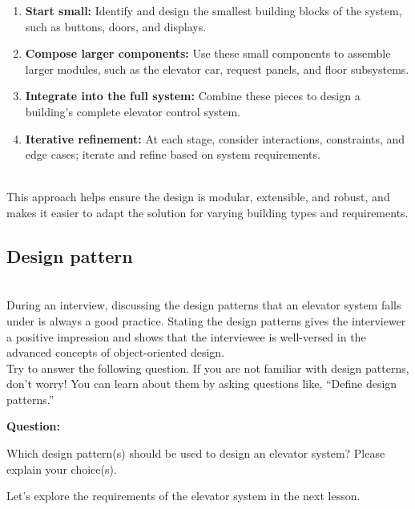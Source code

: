 \begin{enumerate}
\item
\protect{}\label{P9l4Z-e65pwr1nrJHE1EK}
\textbf{Start small:} Identify and design the smallest building blocks of the system, such as buttons, doors, and displays.
\item
\protect{}\label{N8NXqdnxE8TB77BgUiLqc}
\textbf{Compose larger components:} Use these small components to assemble larger modules, such as the elevator car, request panels, and floor subsystems.
\item
\protect{}\label{kTUqqHi9y5usyEqw_kOSg}
\textbf{Integrate into the full system:} Combine these pieces to design a building's complete elevator control system.
\item
\protect{}\label{CuIJZROnYKFfOawuwMVK6}
\textbf{Iterative refinement:} At each stage, consider interactions, constraints, and edge cases; iterate and refine based on system requirements.
\end{enumerate}
\\
This approach helps ensure the design is modular, extensible, and robust, and makes it easier to adapt the solution for varying building types and requirements.

\subsection{Design pattern~}\label{6tiJ6hFlAnJ2c_EuVhEuw}
\\
During an interview, discussing the design patterns that an elevator system falls under is always a good practice. Stating the design patterns gives the interviewer a positive impression and shows that the interviewee is well-versed in the advanced concepts of object-oriented design.
\\
Try to answer the following question. If you are not familiar with design patterns, don't worry! You can learn about them by asking questions like, ``Define design patterns.''

\textbf{Question:}

Which design pattern(s) should be used to design an elevator system? Please explain your choice(s).

Let's explore the requirements of the elevator system in the next lesson.

